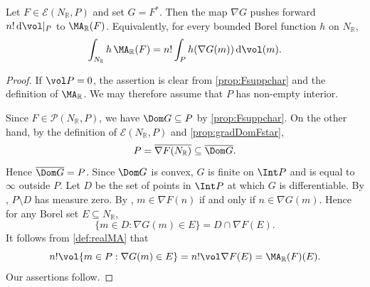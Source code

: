 \begin{lemma}\label{lma:realMA_Legendre_pushforward}
    Let $F\in \mathcal{E}(N_{\mathbb{R}},P)$ and set $G=F^*$. Then the map $\nabla G$ pushes forward $n!\,\mathrm{d}\vol|_{P}$ to $\MA_{\mathbb R}(F)$. Equivalently, for every bounded Borel function $h$ on $N_{\mathbb R}$,
    \[
        \int_{N_{\mathbb R}} h\,\MA_{\mathbb R}(F)= n!\int_P h(\nabla G(m))\,\mathrm{d}\vol(m).
    \]
\end{lemma}
\begin{proof}
    If $\vol P=0$, the assertion is clear from \cref{prop:Fsuppchar} and the definition of $\MA_{\mathbb R}$. We may therefore assume that $P$ has non-empty interior.

    Since $F\in \mathcal P(N_{\mathbb R},P)$, we have $\Dom G\subseteq P$ by \cref{prop:Fsuppchar}. On the other hand, by the definition of $\mathcal E(N_{\mathbb R},P)$ and \cref{prop:gradDomFstar},
    \[
        P=\overline{\nabla F(N_{\mathbb R})}\subseteq \overline{\Dom G}.
    \]
    Hence $\overline{\Dom G}=P$. Since $\Dom G$ is convex, $G$ is finite on $\Int P$ and is equal to $\infty$ outside $P$. Let $D$ be the set of points in $\Int P$ at which $G$ is differentiable. By \cite[Theorem~25.5]{Roc70}, $P\setminus D$ has measure zero. By \cite[Theorem~23.5]{Roc70}, $m\in\nabla F(n)$ if and only if $n\in\nabla G(m)$. Hence for any Borel set $E\subseteq N_{\mathbb R}$,
    \[
        \{m\in D:\nabla G(m)\in E\}=D\cap \nabla F(E).
    \]
    It follows from \cref{def:realMA} that
    \[
        n!\vol \{m\in P:\nabla G(m)\in E\}=n!\vol \nabla F(E)=\MA_{\mathbb R}(F)(E).
    \]
    Our assertions follow.
\end{proof}

